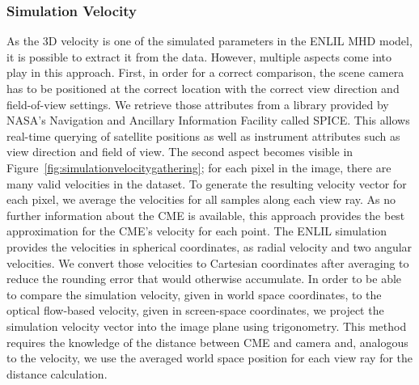 \documentclass[journal]{vgtc}                %
\begin{document}
\subsubsection{Simulation Velocity} \label{sec:simulationvelocity}
As the 3D velocity is one of the simulated parameters in the ENLIL MHD model, it is possible to extract it from the data. However, multiple aspects come into play in this approach. First, in order for a correct comparison, the scene camera has to be positioned at the correct location with the correct view direction and field-of-view settings. We retrieve those attributes from a library provided by NASA's Navigation and Ancillary Information Facility called SPICE. This allows real-time querying of satellite positions as well as instrument attributes such as view direction and field of view. The second aspect becomes visible in Figure~\ref{fig:simulationvelocitygathering}; for each pixel in the image, there are many valid velocities in the dataset. To generate the resulting velocity vector for each pixel, we average the velocities for all samples along each view ray. As no further information about the CME is available, this approach provides the best approximation for the CME's velocity for each point. The ENLIL simulation provides the velocities in spherical coordinates, as radial velocity and two angular velocities. We convert those velocities to Cartesian coordinates after averaging to reduce the rounding error that would otherwise accumulate. In order to be able to compare the simulation velocity, given in world space coordinates, to the optical flow-based velocity, given in screen-space coordinates, we project the simulation velocity vector into the image plane using trigonometry. This method requires the knowledge of the distance between CME and camera and, analogous to the velocity, we use the averaged world space position for each view ray for the distance calculation. 


\end{document}
